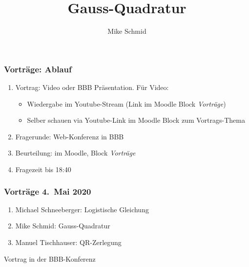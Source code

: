 %
%
%



\begin{frame}
\frametitle{Vorträge: Ablauf}
\begin{enumerate}
\item<2-> Vortrag: Video oder BBB Präsentation. Für Video:
\begin{itemize}
\item<3-> Wiedergabe im Youtube-Stream  (Link im Moodle Block {\em Vorträge})
\item<4-> Selber schauen via Youtube-Link im Moodle Block zum Vortrags-Thema
\end{itemize}
\item<5-> Fragerunde: Web-Konferenz in BBB
\item<6-> Beurteilung: im Moodle, Block {\em Vorträge}
\bigskip
\item<7-> Fragezeit bis 18:40
\end{enumerate}
\end{frame}

\begin{frame}
\frametitle{Vorträge 4.~Mai 2020}
\begin{enumerate}
\item<2->
Michael Schneeberger: Logistische Gleichung
\bigskip

\item<3->
Mike Schmid: Gauss-Quadratur
\bigskip

\item<4->
Manuel Tischhauser: QR-Zerlegung

\end{enumerate}
\end{frame}

\title[Vorträge]{Gauss-Quadratur}
\author[A.~Müller]{Mike Schmid}
\date[]{}

\begin{frame}

\titlepage

\begin{center}
Vortrag in der BBB-Konferenz
\end{center}

\end{frame}
